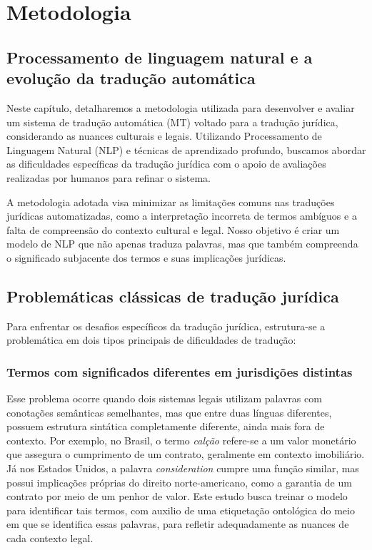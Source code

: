 \chapter{Metodologia}

\section{Processamento de linguagem natural e a evolução da tradução automática}

Neste capítulo, detalharemos a metodologia utilizada para desenvolver e avaliar um sistema de tradução automática (MT) voltado para a tradução jurídica, considerando as nuances culturais e legais. Utilizando Processamento de Linguagem Natural (NLP) e técnicas de aprendizado profundo, buscamos abordar as dificuldades específicas da tradução jurídica com o apoio de avaliações realizadas por humanos para refinar o sistema.

A metodologia adotada visa minimizar as limitações comuns nas traduções jurídicas automatizadas, como a interpretação incorreta de termos ambíguos e a falta de compreensão do contexto cultural e legal. Nosso objetivo é criar um modelo de NLP que não apenas traduza palavras, mas que também compreenda o significado subjacente dos termos e suas implicações jurídicas.

\section{Problemáticas clássicas de tradução jurídica}

Para enfrentar os desafios específicos da tradução jurídica, estrutura-se a problemática em dois tipos principais de dificuldades de tradução:

\subsection{Termos com significados diferentes em jurisdições distintas}

Esse problema ocorre quando dois sistemas legais utilizam palavras com conotações semânticas semelhantes, mas que entre duas línguas diferentes, possuem estrutura sintática completamente diferente, ainda mais fora de contexto. 
Por exemplo, no Brasil, o termo \textit{calção} refere-se a um valor monetário que assegura o cumprimento de um contrato, geralmente em contexto imobiliário. Já nos Estados Unidos, a palavra \textit{consideration} cumpre uma função similar, mas possui implicações próprias do direito norte-americano, como a garantia de um contrato por meio de um penhor de valor. Este estudo busca treinar o modelo para identificar tais termos, com auxilio de uma etiquetação ontológica do meio em que se identifica essas palavras, para refletir adequadamente as nuances de cada contexto legal.

